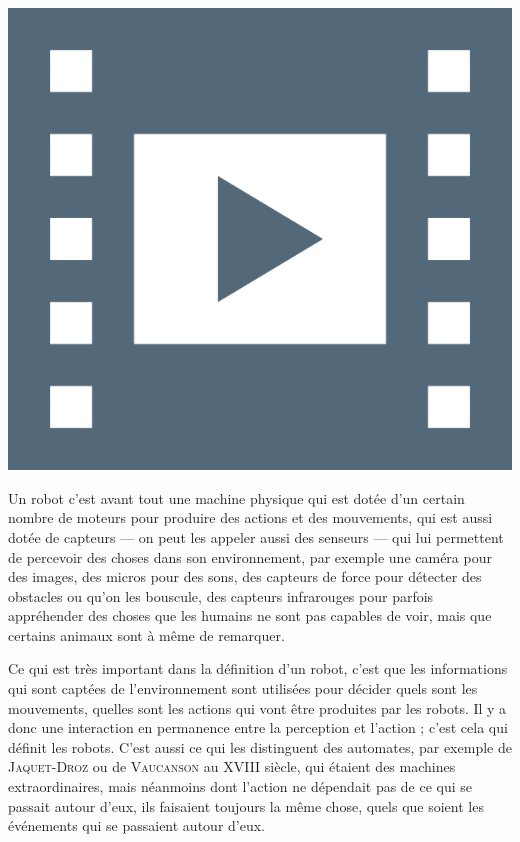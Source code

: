 \begin{marginvideo}
	[\label{vid:III.2}Robotique I.]%
	\href{https://www.youtube.com/watch?v=m9Ws5D3kuXI}%
	  {\includegraphics[width=\marginparwidth]{./Images/Pictograms/film-strip-dark-electric-blue.png}}%
\end{marginvideo}

Un robot c'est avant tout une machine physique qui est dotée d'un certain nombre de moteurs pour produire des actions et des mouvements, qui est aussi dotée de capteurs --- on peut les appeler aussi des senseurs --- qui lui permettent de percevoir des choses dans son environnement, par exemple une caméra pour des images, des micros pour des sons, des capteurs de force pour détecter des obstacles ou qu'on les bouscule, des capteurs infrarouges pour parfois appréhender des choses que les humains ne sont pas capables de voir, mais que certains animaux sont à même de remarquer. 

Ce qui est très important dans la définition d'un robot, c'est que les informations qui sont captées de l'environnement sont utilisées pour décider quels sont les mouvements, quelles sont les actions qui vont être produites par les robots. Il y a donc une interaction en permanence entre la perception et l'action ; c'est cela qui définit les robots. C'est aussi ce qui les distinguent des automates, par exemple de \textsc{Jaquet-­Droz} ou de \textsc{Vaucanson} au XVIII siècle, qui étaient des machines extraordinaires, mais néanmoins dont l'action ne dépendait pas de ce qui se passait autour d'eux, ils faisaient toujours la même chose, quels que soient les événements qui se passaient autour d'eux. 

